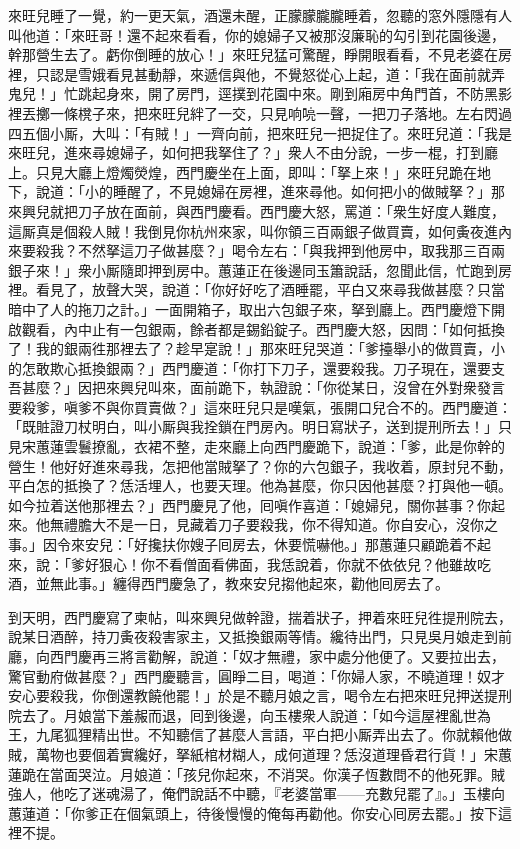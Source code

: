 來旺兒睡了一覺，約一更天氣，酒還未醒，正朦朦朧朧睡着，忽聽的窓外隱隱有人叫他道：「來旺哥！還不起來看看，你的媳婦子又被那沒廉恥的勾引到花園後邊，幹那營生去了。虧你倒睡的放心！」{}來旺兒猛可驚醒，睜開眼看看，不見老婆在房裡，只認是雪娥看見甚動靜，來遞信與他，不覺怒從心上起，道：「我在面前就弄鬼兒！」忙跳起身來，開了房門，逕撲到花園中來。剛到廂房中角門首，不防黑影裡丟擲一條櫈子來，把來旺兒絆了一交，只見响喨一聲，一把刀子落地。左右閃過四五個小厮，大叫：「有賊！」一齊向前，把來旺兒一把捉住了。來旺兒道：「我是來旺兒，進來尋媳婦子，如何把我拏住了？」衆人不由分說，一步一棍，打到廳上。只見大廳上燈燭熒煌，西門慶坐在上面，即叫：「拏上來！」來旺兒跪在地下，說道：「小的睡醒了，不見媳婦在房裡，進來尋他。如何把小的做賊拏？」那來興兒就把刀子放在面前，與西門慶看。西門慶大怒，罵道：「衆生好度人難度，這厮真是個殺人賊！我倒見你杭州來家，叫你領三百兩銀子做買賣，如何夤夜進內來要殺我？不然拏這刀子做甚麼？」喝令左右：「與我押到他房中，取我那三百兩銀子來！」衆小厮隨即押到房中。蕙蓮正在後邊同玉簫說話，忽聞此信，忙跑到房裡。看見了，放聲大哭，說道：「你好好吃了酒睡罷，平白又來尋我做甚麼？只當暗中了人的拖刀之計。」一面開箱子，取出六包銀子來，拏到廳上。西門慶燈下開啟觀看，內中止有一包銀兩，餘者都是錫鉛錠子。西門慶大怒，因問：「如何抵換了！我的銀兩徃那裡去了？趁早寔說！」那來旺兒哭道：「爹擡舉小的做買賣，小的怎敢欺心抵換銀兩？」西門慶道：「你打下刀子，還要殺我。刀子現在，還要支吾甚麼？」因把來興兒叫來，面前跪下，執證說：「你從某日，沒曾在外對衆發言要殺爹，嗔爹不與你買賣做？」這來旺兒只是嘆氣，張開口兒合不的。西門慶道：「既賍證刀杖明白，叫小厮與我拴鎖在門房內。明日寫狀子，送到提刑所去！」只見宋蕙蓮雲鬟撩亂，衣裙不整，走來廳上向西門慶跪下，說道：「爹，此是你幹的營生！他好好進來尋我，怎把他當賊拏了？你的六包銀子，我收着，原封兒不動，平白怎的抵換了？恁活埋人，也要天理。他為甚麼，你只因他甚麼？{}打與他一頓。如今拉着送他那裡去？」西門慶見了他，囘嗔作喜道：「媳婦兒，關你甚事？你起來。他無禮膽大不是一日，見藏着刀子要殺我，你不得知道。你自安心，沒你之事。」因令來安兒：「好攙扶你嫂子囘房去，休要慌嚇他。」{}那蕙蓮只顧跪着不起來，說：「爹好狠心！你不看僧面看佛面，我恁說着，你就不依依兒？{}他雖故吃酒，並無此事。」纏得西門慶急了，教來安兒搊他起來，勸他囘房去了。

到天明，西門慶寫了柬帖，叫來興兒做幹證，揣着狀子，押着來旺兒徃提刑院去，說某日酒醉，持刀夤夜殺害家主，又抵換銀兩等情。纔待出門，只見吳月娘走到前廳，向西門慶再三將言勸解，說道：「奴才無禮，家中處分他便了。又要拉出去，驚官動府做甚麼？」西門慶聽言，圓睜二目，喝道：「你婦人家，不曉道理！奴才安心要殺我，你倒還教饒他罷！」{}於是不聽月娘之言，喝令左右把來旺兒押送提刑院去了。月娘當下羞赧而退，囘到後邊，向玉樓衆人說道：「如今這屋裡亂世為王，九尾狐狸精出世。不知聽信了甚麼人言語，平白把小厮弄出去了。你就賴他做賊，萬物也要個着實纔好，拏紙棺材糊人，成何道理？恁沒道理昏君行貨！」宋蕙蓮跪在當面哭泣。月娘道：「孩兒你起來，不消哭。你漢子恆數問不的他死罪。賊強人，他吃了迷魂湯了，俺們說話不中聽，『老婆當軍——充數兒罷了』。」玉樓向蕙蓮道：「你爹正在個氣頭上，待後慢慢的俺每再勸他。你安心囘房去罷。」按下這裡不提。

